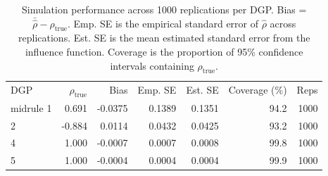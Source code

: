 \begin{table}[ht]
\centering
\caption{Simulation performance across 1000 replications per DGP.
Bias = $\bar{\hat{\rho}} - \rho_{\mathrm{true}}$.
Emp. SE is the empirical standard error of $\hat{\rho}$ across replications.
Est. SE is the mean estimated standard error from the influence function.
Coverage is the proportion of 95\% confidence intervals containing $\rho_{\mathrm{true}}$.}
\label{tab:performance}
\begin{tabular}{lrrrrrr}
\toprule
DGP & $\rho_{\mathrm{true}}$ & Bias & Emp. SE & Est. SE & Coverage (\%) & Reps \\midrule
1 & 0.691 & -0.0375 & 0.1389 & 0.1351 & 94.2 & 1000 \\
2 & -0.884 & 0.0114 & 0.0432 & 0.0425 & 93.2 & 1000 \\
4 & 1.000 & -0.0007 & 0.0007 & 0.0008 & 99.8 & 1000 \\
5 & 1.000 & -0.0004 & 0.0004 & 0.0004 & 99.9 & 1000 \\
\bottomrule
\end{tabular}
\end{table}